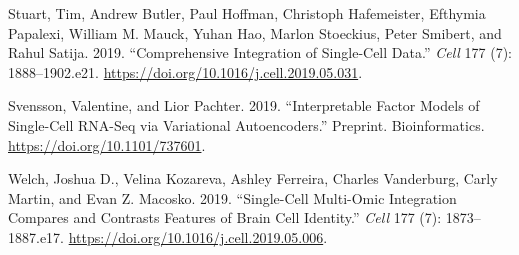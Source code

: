 \documentclass[]{article}
\begin{document}
\leavevmode\hypertarget{ref-stuartComprehensiveIntegrationSingleCell2019a}{}%
Stuart, Tim, Andrew Butler, Paul Hoffman, Christoph Hafemeister,
Efthymia Papalexi, William M. Mauck, Yuhan Hao, Marlon Stoeckius, Peter
Smibert, and Rahul Satija. 2019. ``Comprehensive Integration of
Single-Cell Data.'' \emph{Cell} 177 (7): 1888--1902.e21.
\url{https://doi.org/10.1016/j.cell.2019.05.031}.

\leavevmode\hypertarget{ref-svenssonInterpretableFactorModels2019}{}%
Svensson, Valentine, and Lior Pachter. 2019. ``Interpretable Factor
Models of Single-Cell RNA-Seq via Variational Autoencoders.'' Preprint.
Bioinformatics. \url{https://doi.org/10.1101/737601}.

\leavevmode\hypertarget{ref-welchSingleCellMultiomicIntegration2019a}{}%
Welch, Joshua D., Velina Kozareva, Ashley Ferreira, Charles Vanderburg,
Carly Martin, and Evan Z. Macosko. 2019. ``Single-Cell Multi-Omic
Integration Compares and Contrasts Features of Brain Cell Identity.''
\emph{Cell} 177 (7): 1873--1887.e17.
\url{https://doi.org/10.1016/j.cell.2019.05.006}.
\end{document}
